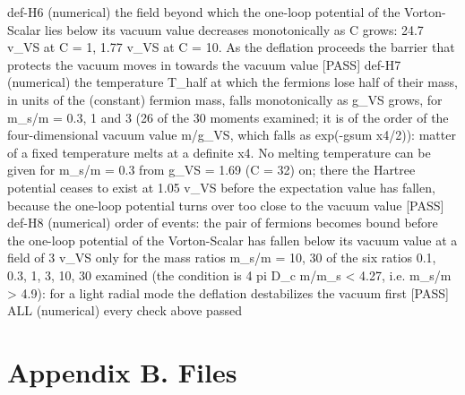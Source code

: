 \documentclass[
  10pt,
]{article}
\newenvironment{Shaded}{}{}
\newcommand{\NormalTok}[1]{#1}
\begin{document}
\begin{Shaded}
\begin{Highlighting}[]
\NormalTok{[PASS] def{-}H6  (numerical) the field beyond which the one{-}loop potential of the Vorton{-}Scalar lies below its vacuum value decreases monotonically as C grows: 24.7 v\_VS at C = 1, 1.77 v\_VS at C = 10. As the deflation proceeds the barrier that protects the vacuum moves in towards the vacuum value}
\NormalTok{[PASS] def{-}H7  (numerical) the temperature T\_half at which the fermions lose half of their mass, in units of the (constant) fermion mass, falls monotonically as g\_VS grows, for m\_s/m = 0.3, 1 and 3 (26 of the 30 moments examined; it is of the order of the four{-}dimensional vacuum value m/g\_VS, which falls as exp({-}gsum x4/2)): matter of a fixed temperature melts at a definite x4. No melting temperature can be given for m\_s/m = 0.3 from g\_VS = 1.69 (C = 32) on; there the Hartree potential ceases to exist at 1.05 v\_VS before the expectation value has fallen, because the one{-}loop potential turns over too close to the vacuum value}
\NormalTok{[PASS] def{-}H8  (numerical) order of events: the pair of fermions becomes bound before the one{-}loop potential of the Vorton{-}Scalar has fallen below its vacuum value at a field of 3 v\_VS only for the mass ratios m\_s/m = 10, 30 of the six ratios 0.1, 0.3, 1, 3, 10, 30 examined (the condition is 4 pi D\_c m/m\_s \textless{} 4.27, i.e. m\_s/m \textgreater{} 4.9): for a light radial mode the deflation destabilizes the vacuum first}
\NormalTok{[PASS] ALL  (numerical) every check above passed}
\end{Highlighting}
\end{Shaded}

\hypertarget{appendix-b.-files}{%
\section{Appendix B. Files}\label{appendix-b.-files}}
\end{document}

